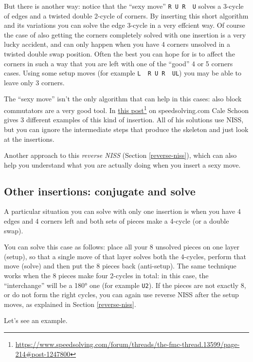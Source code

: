 \documentclass[11pt,a4paper]{book}
\newcommand{\p}{\textquotesingle}
\newcommand{\m}{\texttt}
\newcommand{\ps}{\p\,\,}
\begin{document}
But there is another way: notice that the ``sexy move'' \m{R U R\ps U\p} solves a 3-cycle of edges and a twisted double 2-cycle of corners. By inserting this short algorithm and its variations you can solve the edge 3-cycle in a very effcient way. Of course the case of also getting the corners completely solved with one insertion is a very lucky accident, and can only happen when you have 4 corners unsolved in a twisted double swap position. Often the best you can hope for is to affect the corners in such a way that you are left with one of the ``good'' 4 or 5 corners cases. Using some setup moves (for example \m{L\ps R U R\ps U\p L}) you may be able to leave only 3 corners.

The ``sexy move'' isn't the only algorithm that can help in this cases: also block commutators are a very good tool. In \href{https://www.speedsolving.com/forum/threads/the-fmc-thread.13599/page-214\#post-1247800}{this post}\footnote{\url{https://www.speedsolving.com/forum/threads/the-fmc-thread.13599/page-214\#post-1247800}} on speedsolving.com Cale Schoon gives 3 different examples of this kind of insertion. All of his solutions use NISS, but you can ignore the intermediate steps that produce the skeleton and just look at the insertions.

Another approach to this \emph{reverse NISS} (Section \ref{reverse-niss}), which can also help you understand what you are actually doing when you insert a sexy move.

\subsection{Other insertions: conjugate and solve}

A particular situation you can solve with only one insertion is when you have 4 edges and 4 corners left and both sets of pieces make a 4-cycle (or a double swap).

You can solve this case as follows: place all your 8 unsolved pieces on one layer (setup), so that a single move of that layer solves both the 4-cycles, perform that move (solve) and then put the 8 pieces back (anti-setup). The same technique works when the 8 pieces make four 2-cycles in total: in this case, the ``interchange'' will be a 180° one (for example \m{U2}). If the pieces are not exactly 8, or do not form the right cycles, you can again use reverse NISS after the setup moves, as explained in Section \ref{reverse-niss}.

Let's see an example.
\end{document}
